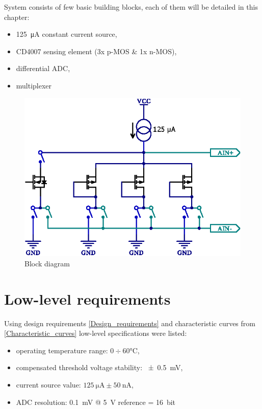     System consists of few basic building blocks, each of them will be detailed in this chapter:
    \begin{itemize}
        \item \SI{125}{\uA} constant current source,
        \item CD4007 sensing element (3x p-MOS \& 1x n-MOS),
        \item differential ADC,
        \item multiplexer
    \end{itemize}


    \begin{figure}[H]
        \centering
        \includegraphics[width=0.7\paperwidth]{img/06/CD4007_mux_schematic.eps}
        \caption{Block diagram}
        \label{sensor_block_diagram}
    \end{figure}

\section{Low-level requirements}
    Using design requirements \ref{Design_requirements} and characteristic curves from \ref{Characteristic_curves} low-level specifications were listed:
    \begin{itemize}
        \item operating temperature range: $0 \div 60 \si{\degreeCelsius}$,
        \item compensated threshold voltage stability: \SI{\pm 0.5}{\milli\volt},
        \item current source value: $\SI{125}{\micro\ampere} \pm \SI{50}{\nano\ampere}$,
        \item ADC resolution: \SI{0.1}{\milli\volt} @ \SI{5}{\volt} reference = \SI{16}{bit}
    \end{itemize}


